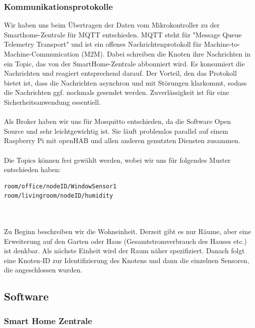 \documentclass[a4paper,10pt,twocolumn]{article}
\begin{document}
\subsubsection{Kommunikationsprotokolle}

Wir haben uns beim Übertragen der Daten vom Mikrokontroller zu der Smarthome-Zentrale für \ac{MQTT} entschieden. \ac{MQTT} steht für "Message Queue Telemetry Transport" und ist ein offenes Nachrichtenprotokoll für Machine-to-Machine-Communication (M2M). Dabei schreiben die Knoten ihre Nachrichten in ein Topic, das von der SmartHome-Zentrale abbonniert wird. Es konsumiert die Nachrichten und reagiert entsprechend darauf. Der Vorteil, den das Protokoll bietet ist, dass die Nachrichten asynchron und mit Störungen klarkommt, sodass die Nachrichten ggf. nochmals gesendet werden. Zuverlässigkeit ist für eine Sicherheitsanwendung essentiell.\\\\
Als Broker haben wir uns für Mosquitto entschieden, da die Software Open Source und sehr leichtgewichtig ist. Sie läuft problemlos parallel auf einem Raspberry Pi mit openHAB und allen anderen genutzten Diensten zusammen.\\\\
Die Topics können frei gewählt werden, wobei wir uns für folgendes Muster entschieden haben:
\begin{lstlisting}[numbers=none]
room/office/nodeID/WindowSensor1
room/livingroom/nodeID/humidity
\end{lstlisting}\\\\
Zu Beginn beschreiben wir die Wohneinheit. Derzeit gibt es nur Räume, aber eine Erweiterung auf den Garten oder Haus (Gesamtstromverbrauch des Hauses etc.) ist denkbar. Als nächste Einheit wird der Raum näher spezifiziert. Danach folgt eine Knoten-ID zur Identifizierung des Knotens und dann die einzelnen Sensoren, die angeschlossen wurden.

\subsection{Software}

\subsubsection{Smart Home Zentrale}
\end{document}
